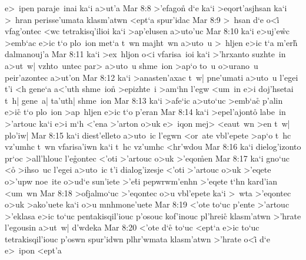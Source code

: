 e>~ipen
paraje~inai
ka`i
a>ut'a\bibvsend
\vs Mar 8:8
>'efagon\r{}
d`e
ka`i
>eqort'asjhsan
ka`i
>~hran
perisse'umata
klasm'atwn
<ept`a
spur'idac\bibvsend
\vs Mar 8:9
>~hsan
d`e
o<i\r{}
vfag'ontec
<wc
tetrakisq'ilioi
ka`i
>ap'elusen
a>uto'uc\bibvsend
\vs Mar 8:10
ka`i
e>uj'e\r{w}c
>emb`ac
e>ic
t`o
plo~ion
met`a
t~wn
majht~wn
a>uto~u
>~hljen
e>ic
t`a
m'erh\r{}
dalmanouj'a\bibvsend
\vs Mar 8:11
ka`i
>ex~hljon
o<i
vfarisa~ioi
ka`i
>'hrxanto
suzhte~in
a>ut~w|
vzhto~untec
par>
a>uto~u
shme~ion
>ap`o
to~u
o>urano~u
peir'azontec
a>ut'on\bibvsend
\vs Mar 8:12
ka`i
>anasten'axac
t~w|
pne'umati
a>uto~u
l'egei
t'i
<h
gene`a
a<'uth
shme~ion\r{}
>epizhte~i
>am`hn
l'egw
<um~in
e>i
doj'hsetai
t~h|
gene~a|
ta'uth|
shme~ion\bibvsend
\vs Mar 8:13
ka`i
>afe`ic
a>uto`uc
>emb`ac\r{}
p'alin
e>ic\r{}
t`o
plo~ion
>ap~hljen
e>ic
t`o
p'eran\bibvsend
\vs Mar 8:14
ka`i
>epel'ajont\r{o}
labe~in
>'artouc
ka`i
e>i
m`h
<'ena
>'arton
o>uk
e>~iqon
mej>
<eaut~wn
>en
t~w|
plo'iw|\bibvsend
\vs Mar 8:15
ka`i
diest'elleto
a>uto~ic
l'egwn
<or~ate
vbl'epete
>ap`o
t~hc
vz'umhc
t~wn
vfarisa'iwn
ka`i
t~hc
vz'umhc
<hr'wdou\bibvsend
\vs Mar 8:16
ka`i
dielog'izonto
pr`oc
>all'hlouc
l'e\r{g}ontec
<'oti
>'artouc
o>uk
>'eqo\r{m}en\bibvsend
{}
\vs Mar 8:17
ka`i
gno`uc
<o\r{}
>ihso~uc
l'egei
a>uto~ic
t'i
dialog'izesje
<'oti
>'artouc
o>uk
>'eqete
o>'upw
noe~ite
o>ud`e
sun'iete
>'e\r{t}i
pepwrwm'enhn
>'eqete
t`hn
kard'ian
<um~wn\bibvsend
\vs Mar 8:18
>ofjalmo`uc
>'eqontec
o>u
vbl'epete
ka`i
>~wta
>'eqontec
o>uk
>ako'uete
ka`i
o>u
mnhmone'uete\bibvsend
\vs Mar 8:19
<'ote
to`uc
p'ente
>'artouc
>'eklasa
e>ic
to`uc
pentakisqil'iouc
p'osouc
kof'inouc
pl'hreic\r{}
klasm'atwn
>'hrate
l'egousin
a>ut~w|
d'wdeka\bibvsend
\vs Mar 8:20
<'ote
d`e\r{}
to`uc
<ept`a
e>ic
to`uc
tetrakisqil'iouc
p'oswn
spur'idwn
plhr'wmata
klasm'atwn
>'hrate
o<i\r{}
d`e
e>~ipon
<ept'a\bibvsend
